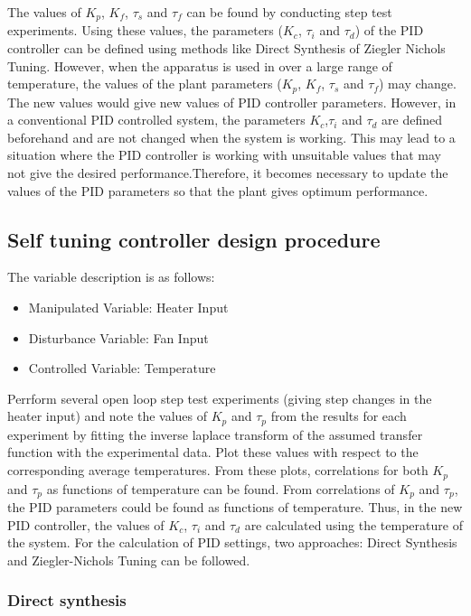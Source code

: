 The values of $K_p$, $K_f$, $\tau_s$ and $\tau_f$ can be found by conducting step test experiments. Using these values, the parameters ($K_c$,  $\tau_i$ and  $\tau_d$) of the PID controller can be defined using methods like Direct Synthesis of Ziegler Nichols Tuning.
However, when the apparatus is used in over a large range of temperature, the values of the plant parameters ($K_p$, $K_f$, $\tau_s$ and $\tau_f$) may change. The new values would give new values of PID controller parameters. However, in a conventional PID controlled system, the parameters $K_c$,$\tau_i$ and $\tau_d$ are defined beforehand and are not changed when the system is working. This may lead to a situation where the PID controller is working with unsuitable values that may not give the desired performance.Therefore, it becomes necessary to update the values of the PID parameters so that the plant gives optimum performance.

\subsection{Self tuning controller design procedure}
The variable description is as follows:
\begin{itemize}
	\item  Manipulated Variable: Heater Input
	\item  Disturbance Variable: Fan Input
	\item  Controlled Variable: Temperature
\end{itemize}

Perrform several open loop step test experiments (giving step changes in the heater input) and note the values of $K_p$ and $\tau_p$  from the results for each experiment by fitting the inverse laplace transform of the assumed transfer function with the experimental data. Plot these values with respect to the corresponding average temperatures. From these plots, correlations for both $K_p$ and $\tau_p$ as functions of temperature can be found. 
From correlations of  $K_p$ and $\tau_p$, the PID parameters could be found as functions of temperature. Thus, in the new PID controller, the values of $K_c$, $\tau_i$ and $\tau_d$ are calculated using the temperature of the system. For the calculation of PID settings, two approaches: Direct Synthesis and Ziegler-Nichols Tuning can be followed.



\subsubsection{Direct synthesis}

